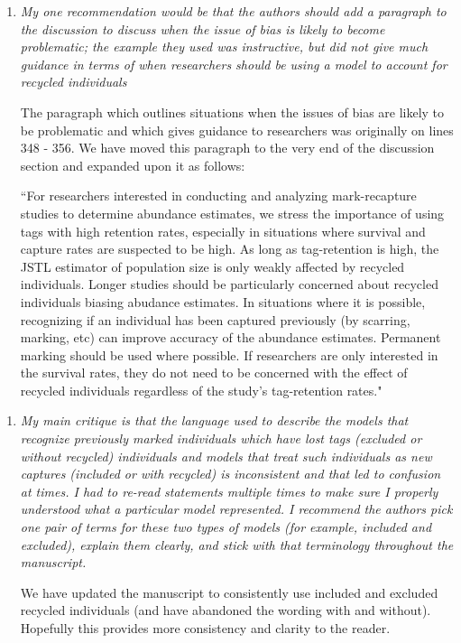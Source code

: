 \documentclass[12pt]{article}
\begin{document}
\begin{enumerate}
\item  {\it My one recommendation would be that the authors should add a paragraph to the discussion to discuss when the issue of bias is likely to become problematic;  the example they used was instructive,  but did not give much guidance in terms of when researchers should be using a model to account for recycled individuals}

The paragraph which outlines situations when the issues of bias are likely to be problematic and which gives guidance to researchers was originally on lines 348 - 356. We have moved this paragraph to the very end of the discussion section and expanded upon it as follows: 

``For researchers interested in conducting and analyzing mark-recapture
studies to determine abundance estimates, we stress the importance of using tags with high retention
rates, especially in situations where survival and capture rates are
suspected to be high. As long as tag-retention is high, the JSTL
estimator of population size is only weakly affected by recycled individuals. Longer studies should be particularly concerned about recycled individuals biasing abudance estimates.  In
situations where it is possible, recognizing if an individual has been
captured previously (by scarring, marking, etc) can improve accuracy of the
abundance estimates. Permanent marking should be used where possible. If
researchers are only interested in the survival rates, they do not need
to be concerned with the effect of recycled individuals regardless of
the study's tag-retention rates."

\end{enumerate}

\begin{enumerate}
\item  {\it My main critique is that the language used to describe the models that recognize previously marked individuals which have lost tags (excluded or without recycled) individuals and models that treat such individuals as new captures (included or with recycled) is inconsistent and that led to confusion at times. I had to re-read statements multiple times to make sure I properly understood what a particular model represented. I recommend the authors pick one pair of terms for these two types of models (for example, included and excluded), explain them clearly, and stick with that terminology throughout the manuscript.}

We have updated the manuscript to consistently use included and excluded recycled individuals (and have abandoned the wording with and without). Hopefully this provides more consistency and clarity to the reader.
\end{enumerate}
\end{document}
